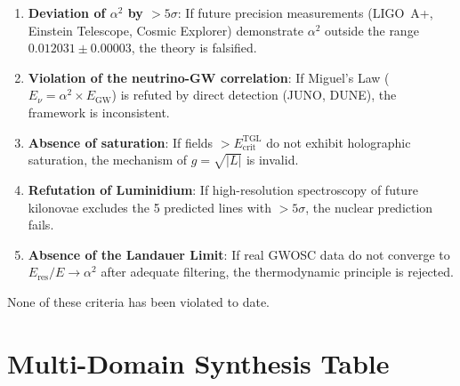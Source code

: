 \documentclass[12pt,a4paper,twoside]{article}
\newcommand{\alphaii}{\alpha^{2}}
\begin{document}
\begin{enumerate}[nosep]
\item \textbf{Deviation of $\alphaii$ by $> 5\sigma$}: If future precision measurements (LIGO~A+, Einstein Telescope, Cosmic Explorer) demonstrate $\alphaii$ outside the range $0.012031 \pm 0.00003$, the theory is falsified.
\item \textbf{Violation of the neutrino-GW correlation}: If Miguel's Law ($E_\nu = \alphaii \times E_{\text{GW}}$) is refuted by direct detection (JUNO, DUNE), the framework is inconsistent.
\item \textbf{Absence of saturation}: If fields $> E_{\text{crit}}^{\text{TGL}}$ do not exhibit holographic saturation, the mechanism of $g = \sqrt{|L|}$ is invalid.
\item \textbf{Refutation of Luminidium}: If high-resolution spectroscopy of future kilonovae excludes the 5 predicted lines with $> 5\sigma$, the nuclear prediction fails.
\item \textbf{Absence of the Landauer Limit}: If real GWOSC data do not converge to $E_{\text{res}}/E \to \alphaii$ after adequate filtering, the thermodynamic principle is rejected.
\end{enumerate}

\noindent None of these criteria has been violated to date.


\section{Multi-Domain Synthesis Table}
\end{document}
